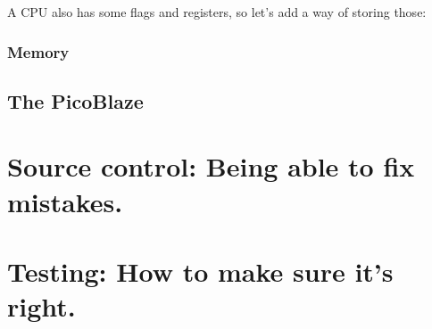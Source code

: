 \documentclass[12pt,a4paper]{article}
\begin{document}


A CPU also has some flags and registers, so let's add a way of storing
those:



\subsubsection{Memory}

\pagebreak
\subsection{The PicoBlaze}

\pagebreak
\section{Source control: Being able to fix mistakes.}

\pagebreak
\section{Testing: How to make sure it's right.}
\end{document}
